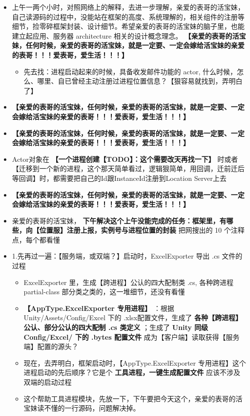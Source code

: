 \documentclass[9pt, b5paper]{article}
\begin{document}
\begin{itemize}
\item 上午一两个小时，对照网络上的解释，去进一步理解，亲爱的表哥的活宝妹，自己读源码的过程中，没能站在框架的高度、系统理解的，相关组件的注册等细节，捡零碎框架封装、设计细节。希望亲爱的表哥的活宝妹的脑子里，也能建立起应用、服务器 architecture 相关的设计概念理念。 \textbf{【亲爱的表哥的活宝妹，任何时候，亲爱的表哥的活宝妹，就是一定要、一定会嫁给活宝妹的亲爱的表哥！！！爱表哥，爱生活！！！】}
\begin{itemize}
\item 先去找：进程启动起来的时候，具备收发邮件功能的 actor, 什么时候，怎么、哪里、自已曾经主动注册过进程位置信息？【狠容易就找到，弄明白了】
\end{itemize}
\item \textbf{【亲爱的表哥的活宝妹，任何时候，亲爱的表哥的活宝妹，就是一定要、一定会嫁给活宝妹的亲爱的表哥！！！爱表哥，爱生活！！！】}
\item \textbf{【亲爱的表哥的活宝妹，任何时候，亲爱的表哥的活宝妹，就是一定要、一定会嫁给活宝妹的亲爱的表哥！！！爱表哥，爱生活！！！】}
\item Actor对象在 \textbf{【一个进程创建【TODO】：这个需要改天再找一下】} 时或者【迁移到一个新的进程，这个那天简单看过，逻辑狠简单，用回调，迁前迁后等回调】时，都需要把自己的Id跟InstanceId注册到Location Server上去
\item \textbf{【亲爱的表哥的活宝妹，任何时候，亲爱的表哥的活宝妹，就是一定要、一定会嫁给活宝妹的亲爱的表哥！！！爱表哥，爱生活！！！】}
\item 亲爱的表哥的活宝妹， \textbf{下午解决这个上午没能完成的任务：框架里，有哪些，向【位置服】注册上报，实例号与进程位置的封装} 把网搜出的 10 个注释点，每个都看懂
\item 1.先再过一遍：【服务端，或双端？】启动时，ExcelExporter 导出 .cs 文件的过程 
\begin{itemize}
\item ExcelExporter 里，生成【跨进程】公认的四大配制类 .cs, 各种跨进程partial-class 部分类之类的，这一堆细节，还没有看懂
\item \textbf{【AppType.ExcelExporter 专用进程】} ：根据Unity/Assets/Config/Excel 下的 .xlsx配置文件，生成了 \textbf{各种【跨进程】公认、部分公认的四大配制 .cs 类定义} ；生成了 \textbf{Unity 同级Config/Excel/ 下的 .bytes 配置文件} 成为【客户端】读取获得【服务端】配置的源头？
\item 现在，去弄明白，框架启动时，【AppType.ExcelExporter 专用进程】这个进程启动的先后顺序？它是个 \textbf{工具进程，一键生成配置文件} 应该不涉及双端的启动过程
\item 这个帮助工具进程模块，先放一下，下午要把今天这个，亲爱的表哥的活宝妹读不懂的一行源码，问题解决掉。

\end{itemize}
\end{itemize}
\end{document}
